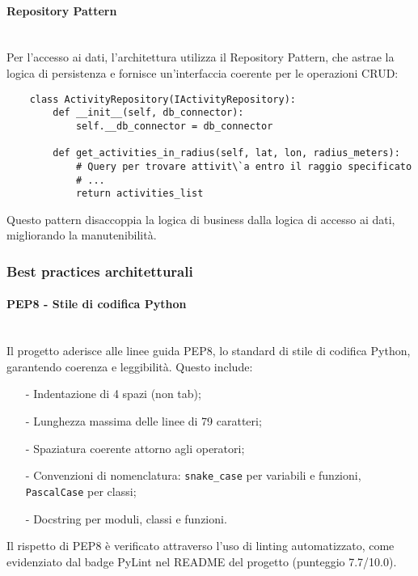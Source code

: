 \documentclass[10pt]{article}
\newcommand{\myparagraph}[1]{\paragraph{#1}\mbox{}\\}
\begin{document}
    \myparagraph{Repository Pattern}
    Per l'accesso ai dati, l'architettura utilizza il Repository Pattern, che astrae la logica di persistenza e fornisce un'interfaccia coerente per le operazioni CRUD:
    \begin{lstlisting}
    class ActivityRepository(IActivityRepository):
        def __init__(self, db_connector):
            self.__db_connector = db_connector

        def get_activities_in_radius(self, lat, lon, radius_meters):
            # Query per trovare attivit\`a entro il raggio specificato
            # ...
            return activities_list
    \end{lstlisting}
    Questo pattern disaccoppia la logica di business dalla logica di accesso ai dati, migliorando la manutenibilità.

    \subsubsection{Best practices architetturali}
    \myparagraph{PEP8 - Stile di codifica Python}
    Il progetto aderisce alle linee guida PEP8, lo standard di stile di codifica Python, garantendo coerenza e leggibilità. Questo include:
    \begin{itemize}
        \item[-] Indentazione di 4 spazi (non tab);
        \item[-] Lunghezza massima delle linee di 79 caratteri;
        \item[-] Spaziatura coerente attorno agli operatori;
        \item[-] Convenzioni di nomenclatura: \texttt{snake\_case} per variabili e funzioni, \texttt{PascalCase} per classi;
        \item[-] Docstring per moduli, classi e funzioni.
    \end{itemize}
    Il rispetto di PEP8 è verificato attraverso l'uso di linting automatizzato, come evidenziato dal badge PyLint nel README del progetto (punteggio 7.7/10.0).
    
\end{document}
